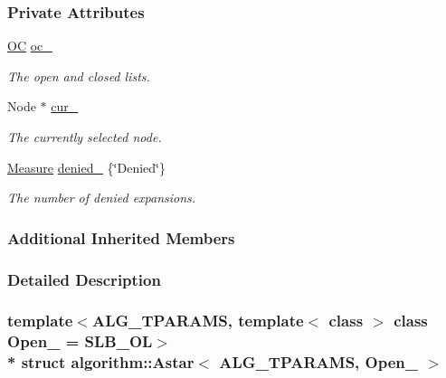 \subsubsection*{Private Attributes}
\begin{DoxyCompactItemize}
\item 
\hyperlink{structalgorithm_1_1Astar_a6a2d412041da0eb508a6940db37c0e32}{OC} \hyperlink{structalgorithm_1_1Astar_aefc61bb8e2fabee3dbe6b1bdf48010e8}{oc\+\_\+}\hypertarget{structalgorithm_1_1Astar_aefc61bb8e2fabee3dbe6b1bdf48010e8}{}\label{structalgorithm_1_1Astar_aefc61bb8e2fabee3dbe6b1bdf48010e8}

\begin{DoxyCompactList}\small\item\em The open and closed lists. \end{DoxyCompactList}\item 
Node $\ast$ \hyperlink{structalgorithm_1_1Astar_aadc3e47d8ff9d049183b3407a4565daa}{cur\+\_\+}\hypertarget{structalgorithm_1_1Astar_aadc3e47d8ff9d049183b3407a4565daa}{}\label{structalgorithm_1_1Astar_aadc3e47d8ff9d049183b3407a4565daa}

\begin{DoxyCompactList}\small\item\em The currently selected node. \end{DoxyCompactList}\item 
\hyperlink{structMeasure}{Measure} \hyperlink{structalgorithm_1_1Astar_aca86217d009b3960fa5fec61c1d2cb17}{denied\+\_\+} \{\char`\"{}Denied\char`\"{}\}\hypertarget{structalgorithm_1_1Astar_aca86217d009b3960fa5fec61c1d2cb17}{}\label{structalgorithm_1_1Astar_aca86217d009b3960fa5fec61c1d2cb17}

\begin{DoxyCompactList}\small\item\em The number of denied expansions. \end{DoxyCompactList}\end{DoxyCompactItemize}
\subsubsection*{Additional Inherited Members}


\subsubsection{Detailed Description}
\subsubsection*{template$<$A\+L\+G\+\_\+\+T\+P\+A\+R\+A\+MS, template$<$ class $>$ class Open\+\_\+ = S\+L\+B\+\_\+\+OL$>$\\*
struct algorithm\+::\+Astar$<$ A\+L\+G\+\_\+\+T\+P\+A\+R\+A\+M\+S, Open\+\_\+ $>$}

